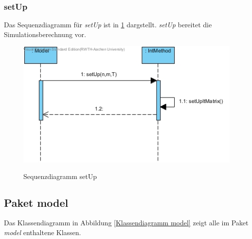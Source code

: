 \subsubsection*{setUp}

Das Sequenzdiagramm für \emph{setUp} ist in \ref{Sequenzdiagramm setUp} dargstellt. \emph{setUp} bereitet die Simulationsberechnung vor.

\begin{figure}[H]
	\centering
	\includegraphics[scale=.6]{Bilder/IntMethod__setUp().jpg}\\
	\caption{Sequenzdiagramm setUp}
	\label{Sequenzdiagramm setUp}
\end{figure}

\subsection{Paket model}

Das Klassendiagramm in Abbildung \ref{Klassendiagramm model} zeigt alle im Paket \emph{model} enthaltene Klassen.

